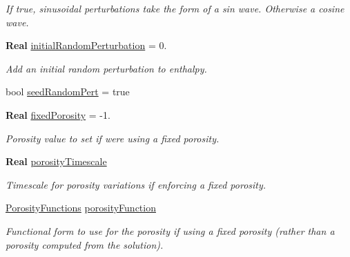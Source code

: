 \begin{DoxyCompactItemize}
\begin{DoxyCompactList}\small\item\em If true, sinusoidal perturbations take the form of a sin wave. Otherwise a cosine wave. \end{DoxyCompactList}\item 
\mbox{\label{struct_mushy_layer_options_a08540a636a44abbf826e32ed27426ec3}} 
\textbf{ Real} \hyperlink{struct_mushy_layer_options_a08540a636a44abbf826e32ed27426ec3}{initial\+Random\+Perturbation} = 0.
\begin{DoxyCompactList}\small\item\em Add an initial random perturbation to enthalpy. \end{DoxyCompactList}\item 
bool \hyperlink{struct_mushy_layer_options_ad38c7a08b2061d98daa9507b9b65877e}{seed\+Random\+Pert} = true
\item 
\textbf{ Real} \hyperlink{struct_mushy_layer_options_a86277f0b87bcf72bbe6b9c78c0da8acf}{fixed\+Porosity} = -\/1.
\begin{DoxyCompactList}\small\item\em Porosity value to set if we\textquotesingle{}re using a fixed porosity. \end{DoxyCompactList}\item 
\mbox{\label{struct_mushy_layer_options_a2bb644686f4626c0c602147b861b19f1}} 
\textbf{ Real} \hyperlink{struct_mushy_layer_options_a2bb644686f4626c0c602147b861b19f1}{porosity\+Timescale}
\begin{DoxyCompactList}\small\item\em Timescale for porosity variations if enforcing a fixed porosity. \end{DoxyCompactList}\item 
\mbox{\label{struct_mushy_layer_options_aeb47e7ed2e0486243c51c1fd815b2ee1}} 
\hyperlink{mushy_layer_opt_8h_af4a9a40836c85b07e8dae4e26a7efb38}{Porosity\+Functions} \hyperlink{struct_mushy_layer_options_aeb47e7ed2e0486243c51c1fd815b2ee1}{porosity\+Function}
\begin{DoxyCompactList}\small\item\em Functional form to use for the porosity if using a fixed porosity (rather than a porosity computed from the solution). \end{DoxyCompactList}\item 

\end{DoxyCompactItemize}
